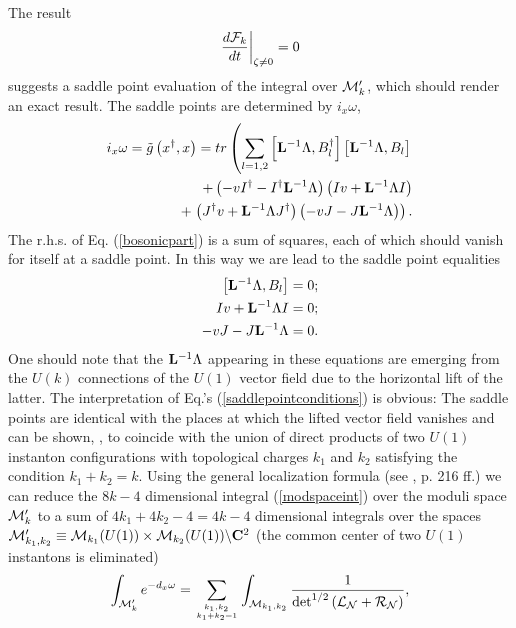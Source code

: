 \documentclass[a4paper,12pt]{article}
\begin{document}
The result
\begin{equation}
\left. \frac{d {\cal F}_k}{d t}\right|_{\zeta \neq 0}=0 \nonumber
\end{equation}
suggests a saddle point evaluation of the integral over ${\cal
M}'_k$, which should render an exact result. The saddle points are
determined by $i_x \omega$,
\begin{eqnarray}
i_x \omega= {\tilde g}\left(x^{\dagger}, x\right)=tr \left(
\sum_{l=1,2}\left[{\bf L}^{-1}\Lambda,
B_l^{\dagger}\right]\left[{\bf L}^{-1}\Lambda, B_l\right]\right.
\nonumber \\ + \left(-vI^{\dagger}-I^{\dagger}{\bf
L}^{-1}\Lambda\right)\left(I v+{\bf L}^{-1}\Lambda I\right)
\nonumber
\\+\left. \left(J^{\dagger}v+{\bf L}^{-1}
\Lambda J^{\dagger}\right)\left( -vJ-J{\bf L}^{-1}\Lambda \right)\right).
\label{bosonicpart}
\end{eqnarray}
The r.h.s. of Eq. (\ref{bosonicpart}) is a sum of squares, each of
which should vanish for itself at a saddle point. In this way we
are lead to the saddle point equalities
\begin{eqnarray}
\left[{\bf L}^{-1}\Lambda, B_l\right]=0; \nonumber \\
I v+{\bf L}^{-1}\Lambda I=0; \nonumber \\
-vJ-J{\bf L}^{-1}\Lambda =0. \label{saddlepointconditions}
\end{eqnarray}
One should note that the ${\bf L}^{-1}\Lambda$ appearing in these
equations are emerging from the $U(k)$ connections of the $U(1)$
vector field due to the horizontal lift of the latter. The
interpretation of Eq.'s (\ref{saddlepointconditions}) is obvious:
The saddle points are identical with the places at which the
lifted vector field vanishes and can be shown, \cite{H}, to
coincide with the union of direct products of two $U(1)$ instanton
configurations with topological charges $k_1$ and $k_2$ satisfying
the condition $k_1+k_2=k$. Using the general localization formula
(see \cite{BGV}, p. 216 ff.) we can reduce the $8k-4$ dimensional
integral (\ref{modspaceint}) over the moduli space ${\cal M}'_k$
to a sum of $4k_1 +4k_2-4=4k-4$ dimensional integrals over the
spaces ${\cal M}'_{k_1 , k_2}\equiv {\cal M}_{k_1}(U(1)) \times
{\cal M}_{k_2}(U(1))\backslash {\bf C}^2$ (the common center of
two $U(1)$ instantons is eliminated)
\begin{equation}
\int_{{\cal M}'_k} e^{-d_x\omega}=\sum_{\sb {k_1, k_2} \atop k_1+k_2=1} \int_{{\cal M}_{k_1 ,
k_2}}\frac{1}{\det^{1/2} \left({\cal L}_{\cal N}+{\cal R}_{\cal N}\right)}, \label{normalbundleint}
\end{equation}
\end{document}
